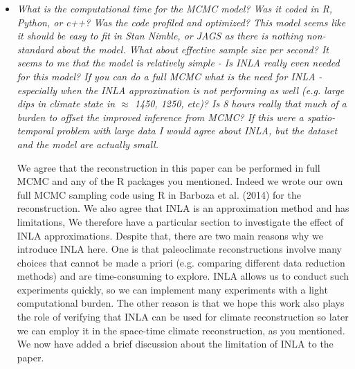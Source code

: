 \documentclass[11pt]{article}
\newcommand{\bl}[1]{\color{red}\textbf{[Bo: #1]}\normalcolor}
\newcommand{\jeg}[1]{\color{blue}\textbf{Julien: #1]}\normalcolor}
\begin{document}
\begin{itemize}
\begin{enumerate}
\end{enumerate}



 




\item \textit{What is the computational time for the MCMC model? Was it coded in
    R, Python, or c++? Was the code profiled and optimized? This model seems
    like it should be easy to fit in Stan Nimble, or JAGS as there is nothing non-standard about the model. What about effective sample size per second? It seems
to me that the model is relatively simple - Is INLA really even needed for this
model? If you can do a full MCMC what is the need for INLA - especially when the
INLA approximation is not performing as well (e.g. large dips in climate state
in $\approx$ 1450, 1250, etc)? Is 8 hours really that much of a burden to offset
the improved
inference from MCMC? If this were a spatio-temporal problem with large data I
would agree about INLA, but the dataset and the model are actually small.
}

We agree that the reconstruction in this paper can be performed in full MCMC and any of the R packages you mentioned. Indeed we wrote our own full MCMC sampling code using R in Barboza et al. (2014) for the reconstruction. We also agree that INLA is an approximation method and has limitations, We therefore have a particular section to investigate the effect of INLA approximations. Despite that,  there are two main reasons why we introduce INLA here. One is that paleoclimate reconstructions involve many choices that cannot be made a priori (e.g. comparing different data reduction methods) and are time-consuming to explore. INLA allows us to conduct such experiments quickly, so we can implement many experiments with a light computational burden. The other reason is that we hope this work also plays the role of verifying that INLA can be used for climate reconstruction so later we can employ it in the space-time climate reconstruction, as you mentioned. We now have added a brief discussion about the limitation of INLA to the paper.



\end{itemize}
\end{document}
